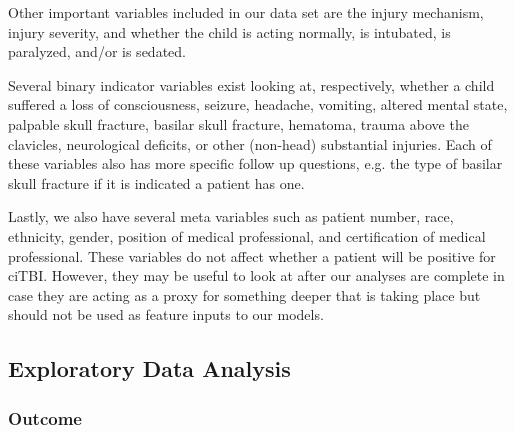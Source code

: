 \documentclass[11pt, letterpaper]{amsart}
\let\Oldsubsection\subsection
\renewcommand{\subsection}{\FloatBarrier\Oldsubsection}
\let\Oldsubsubsection\subsubsection
\renewcommand{\subsubsection}{\FloatBarrier\Oldsubsubsection}
\begin{document}
Other important variables included in our data set are the injury mechanism, injury severity, and whether the child is acting normally, is intubated, is paralyzed, and/or is sedated.

Several binary indicator variables exist looking at, respectively, whether a child suffered a loss of consciousness, seizure, headache, vomiting, altered mental state, palpable skull fracture, basilar skull fracture, hematoma, trauma above the clavicles, neurological deficits, or other (non-head) substantial injuries. Each of these variables also has more specific follow up questions, e.g. the type of basilar skull fracture if it is indicated a patient has one.

Lastly, we also have several meta variables such as patient number, race, ethnicity, gender, position of medical professional, and certification of medical professional. These variables do not affect whether a patient will be positive for ciTBI. However, they may be useful to look at after our analyses are complete in case they are acting as a proxy for something deeper that is taking place but should not be used as feature inputs to our models.

\subsection{Exploratory Data Analysis}

\subsubsection{Outcome}
\end{document}
